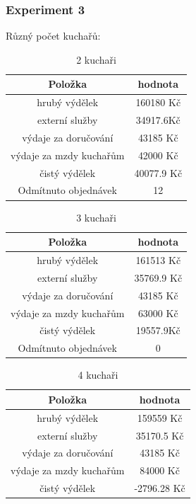 \documentclass[a4paper, 11pt]{article}
\begin{document}
\newpage


\subsubsection{Experiment 3}


Různý počet kuchařů:

\begin{table}[h]
\centering
\begin{tabular}{cc}
\textbf{Položka} & \textbf{hodnota}                                                                                   \\ \hline
hrubý výdělek & 160180 Kč \\ \hline
externí služby  & 34917.6Kč \\ \hline
výdaje za doručování &  43185 Kč \\ \hline
výdaje za mzdy kuchařům &  42000 Kč \\ \hline
čistý výdělek &  40077.9 Kč \\ \hline
Odmítnuto objednávek &  12
\end{tabular}
\caption{2 kuchaři}
\end{table}

\begin{table}[h]
\centering
\begin{tabular}{cc}
\textbf{Položka} & \textbf{hodnota}                                                                                   \\ \hline
hrubý výdělek & 161513 Kč \\ \hline
externí služby  & 35769.9 Kč \\ \hline
výdaje za doručování &  43185 Kč \\ \hline
výdaje za mzdy kuchařům &  63000 Kč \\ \hline
čistý výdělek & 19557.9Kč \\ \hline
Odmítnuto objednávek &  0
\end{tabular}
\caption{3 kuchaři}
\end{table}

\begin{table}[h]
\centering
\begin{tabular}{cc}
\textbf{Položka} & \textbf{hodnota}                                                                                   \\ \hline
hrubý výdělek & 159559 Kč \\ \hline
externí služby  & 35170.5 Kč \\ \hline
výdaje za doručování &  43185 Kč \\ \hline
výdaje za mzdy kuchařům &  84000 Kč \\ \hline
čistý výdělek &  -2796.28 Kč\\ \hline
\end{tabular}
\caption{4 kuchaři}
\end{table}
\end{document}
